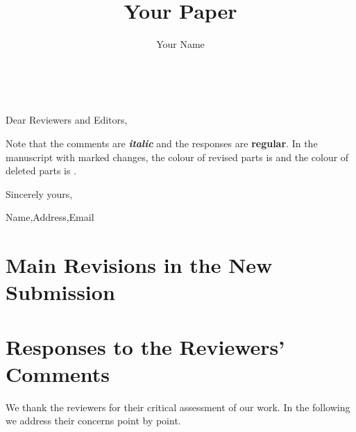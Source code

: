 \documentclass{ar2rc}
\title{Your Paper}
\author{Your Name}
\begin{document}
\maketitle

~\newline

Dear Reviewers and Editors,

Note that the comments are \textit{\textbf{italic}} and the responses are \textbf{regular}. 
In the manuscript with marked changes, the colour of revised parts is  and the colour of deleted parts is .



Sincerely yours,

Name,Address,Email



\newpage


\section{Main Revisions in the New Submission}

\lipsum[2-3]


\newpage



\section{Responses to the Reviewers’ Comments}
We thank the reviewers for their critical assessment of our work. 
In the following we address their concerns point by point. 

\reviewersection
\label{reviewer.1}

\begin{totalcomment}
    \lipsum[1-1]

\end{totalcomment}
\end{document}
